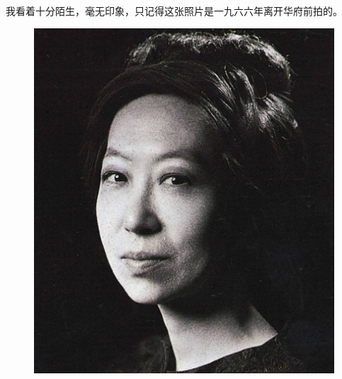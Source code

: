 \par 我看着十分陌生，毫无印象，只记得这张照片是一九六六年离开华府前拍的。
\begin{figure}[htb]
    \centering %
    \includegraphics[scale=0.3]{picture/对照记53_2.jpeg}
\end{figure}




